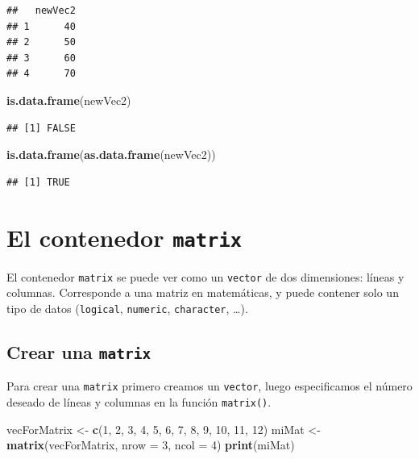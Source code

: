 \documentclass[]{book}
\newenvironment{Shaded}{\begin{snugshade}}{\end{snugshade}}
\newcommand{\KeywordTok}[1]{\textcolor[rgb]{0.13,0.29,0.53}{\textbf{#1}}}
\newcommand{\DataTypeTok}[1]{\textcolor[rgb]{0.13,0.29,0.53}{#1}}
\newcommand{\DecValTok}[1]{\textcolor[rgb]{0.00,0.00,0.81}{#1}}
\newcommand{\StringTok}[1]{\textcolor[rgb]{0.31,0.60,0.02}{#1}}
\newcommand{\NormalTok}[1]{#1}
\begin{document}
\begin{verbatim}
##   newVec2
## 1      40
## 2      50
## 3      60
## 4      70
\end{verbatim}

\begin{Shaded}
\begin{Highlighting}[]
\KeywordTok{is.data.frame}\NormalTok{(newVec2)}
\end{Highlighting}
\end{Shaded}

\begin{verbatim}
## [1] FALSE
\end{verbatim}

\begin{Shaded}
\begin{Highlighting}[]
\KeywordTok{is.data.frame}\NormalTok{(}\KeywordTok{as.data.frame}\NormalTok{(newVec2))}
\end{Highlighting}
\end{Shaded}

\begin{verbatim}
## [1] TRUE
\end{verbatim}

\hypertarget{l014matrix}{\section{\texorpdfstring{El contenedor
\texttt{matrix}}{El contenedor matrix}}\label{l014matrix}}

El contenedor \texttt{matrix} se puede ver como un \texttt{vector} de
dos dimensiones: líneas y columnas. Corresponde a una matriz en
matemáticas, y puede contener solo un tipo de datos (\texttt{logical},
\texttt{numeric}, \texttt{character}, \ldots{}).

\subsection{\texorpdfstring{Crear una
\texttt{matrix}}{Crear una matrix}}\label{crear-una-matrix}

Para crear una \texttt{matrix} primero creamos un \texttt{vector}, luego
especificamos el número deseado de líneas y columnas en la función
\texttt{matrix()}.

\begin{Shaded}
\begin{Highlighting}[]
\NormalTok{vecForMatrix <-}\StringTok{ }\KeywordTok{c}\NormalTok{(}\DecValTok{1}\NormalTok{, }\DecValTok{2}\NormalTok{, }\DecValTok{3}\NormalTok{, }\DecValTok{4}\NormalTok{, }\DecValTok{5}\NormalTok{, }\DecValTok{6}\NormalTok{, }\DecValTok{7}\NormalTok{, }\DecValTok{8}\NormalTok{, }\DecValTok{9}\NormalTok{, }\DecValTok{10}\NormalTok{, }\DecValTok{11}\NormalTok{, }\DecValTok{12}\NormalTok{)}
\NormalTok{miMat <-}\StringTok{ }\KeywordTok{matrix}\NormalTok{(vecForMatrix, }\DataTypeTok{nrow =} \DecValTok{3}\NormalTok{, }\DataTypeTok{ncol =} \DecValTok{4}\NormalTok{)}
\KeywordTok{print}\NormalTok{(miMat)}
\end{Highlighting}
\end{Shaded}
\end{document}

